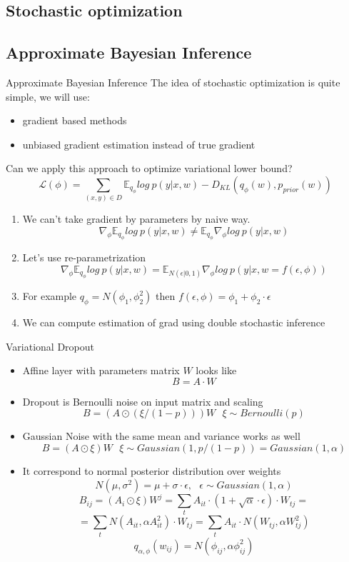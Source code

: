 \documentclass{beamer}
\begin{document}
\subsection{Stochastic optimization}
\subsection{Approximate Bayesian Inference}
\begin{frame}{Approximate Bayesian Inference}
	The idea of stochastic optimization is quite simple, we will use:
	\begin{itemize}
		\item gradient based methods 
		\item unbiased gradient estimation instead of true gradient 
	\end{itemize} 
	\vspace{0.2cm}
	Can we apply this approach to optimize variational lower bound?
	$$\mathcal{L}(\phi) = \sum_{(x, y) \in D}\mathds{E}_{q_{\phi}} log~p(y|x, w) - D_{KL}(q_\phi(w), p_{prior}(w))$$
	\vspace{-0.7cm}
	\begin{enumerate}
		\item We can't take gradient by parameters by naive way.
		$$\nabla_\phi \mathds{E}_{q_{\phi}} log~p(y|x, w) \neq  \mathds{E}_{q_{\phi}} \nabla_\phi log~p(y|x, w) $$
		\item Let's use re-parametrization
		$$\nabla_\phi \mathds{E}_{q_{\phi}} log~p(y|x, w) = \mathds{E}_{N(\epsilon| 0, 1)} \nabla_\phi  log~p(y|x, w=f(\epsilon, \phi))$$
		\item For example $q_{\phi} = N(\phi_1, \phi_2^2)$ then $f(\epsilon, \phi) = \phi_1 + \phi_2 \cdot \epsilon$ 
		\item We can compute estimation of grad using double stochastic inference
	\end{enumerate}
\end{frame}

\begin{frame}{Variational Dropout}
	\begin{itemize}
		\item Affine layer with parameters matrix $W$ looks like
			$$B = A \cdot W$$
		\item Dropout is Bernoulli noise on input matrix and scaling 
			$$B = (A \odot (\xi / (1-p))) W~~~\xi \sim Bernoulli(p)$$
		\item Gaussian Noise with the same mean and variance works as well
			$$B = (A \odot \xi) W~~~\xi \sim Gaussian(1, p/(1-p)) = Gaussian(1, \alpha) $$
		\item It correspond to normal posterior distribution over weights 
			$$N(\mu, \sigma^2) = \mu + \sigma\cdot \epsilon,~~~\epsilon \sim Gaussian(1, \alpha)  $$
			$$B_{ij} = (A_i \odot \xi) W^j = \sum_t A_{it} \cdot (1 + \sqrt{\alpha}\cdot\epsilon) \cdot W_{tj} = $$
			$$ =  \sum_t N(A_{it}, \alpha A_{it}^2) \cdot W_{tj} = \sum_t A_{it}\cdot N(W_{tj}, \alpha W_{tj}^2) $$
		 $$q_{\alpha, \phi}(w_{ij}) = N(\phi_{ij}, \alpha\phi_{ij}^2)$$
	\end{itemize}
\end{frame}
\end{document}
